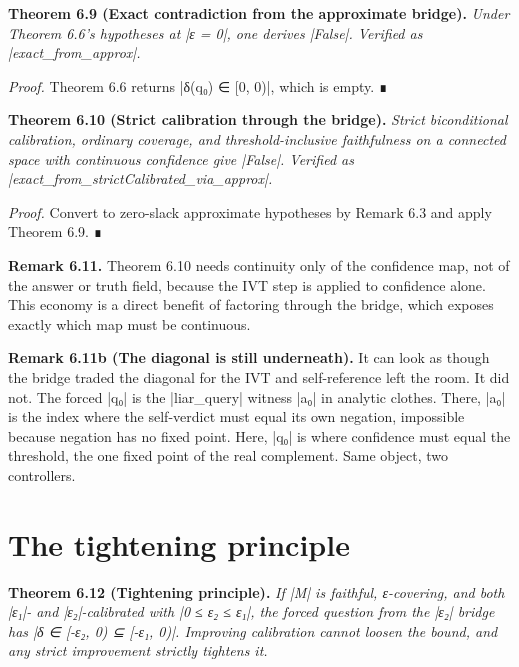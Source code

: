 \documentclass{memoir}
\begin{document}
\textbf{Theorem 6.9 (Exact contradiction from the approximate bridge).} \emph{Under Theorem
6.6's hypotheses at \LeanVerb|ε = 0|, one derives \LeanVerb|False|. Verified as
\LeanVerb|exact_from_approx|.}

\emph{Proof.} Theorem 6.6 returns \LeanVerb|δ(q₀) ∈ [0, 0)|, which is empty. ∎

\textbf{Theorem 6.10 (Strict calibration through the bridge).} \emph{Strict biconditional
calibration, ordinary coverage, and threshold-inclusive faithfulness on a
connected space with continuous confidence give \LeanVerb|False|. Verified as
\LeanVerb|exact_from_strictCalibrated_via_approx|.}

\emph{Proof.} Convert to zero-slack approximate hypotheses by Remark 6.3 and apply
Theorem 6.9. ∎

\textbf{Remark 6.11.} Theorem 6.10 needs continuity only of the confidence map, not of the
answer or truth field, because the IVT step is applied to confidence alone. This
economy is a direct benefit of factoring through the bridge, which exposes
exactly which map must be continuous.

\textbf{Remark 6.11b (The diagonal is still underneath).} It can look as though the bridge
traded the diagonal for the IVT and self-reference left the room. It did not.
The forced \LeanVerb|q₀| is the \LeanVerb|liar_query| witness \LeanVerb|a₀| in analytic clothes. There,
\LeanVerb|a₀| is the index where the self-verdict must equal its own negation, impossible
because negation has no fixed point. Here, \LeanVerb|q₀| is where confidence must equal
the threshold, the one fixed point of the real complement. Same object, two
controllers.



\section{The tightening principle}\label{Two--Schemas--of--Impossibility-005F-005F-005F--Machine--Checked--Limits--of--Trustworthy--Machine--Learning-005F-005F-005F--and--Why--They--Tighten--with--Capability----Approximate--Bridges--to--Real--Models----The--tightening--principle}

\textbf{Theorem 6.12 (Tightening principle).} \emph{If \LeanVerb|M| is faithful, ε-covering, and both
\LeanVerb|ε₁|- and \LeanVerb|ε₂|-calibrated with \LeanVerb|0 ≤ ε₂ ≤ ε₁|, the forced question from the \LeanVerb|ε₂|
bridge has \LeanVerb|δ ∈ [-ε₂, 0) ⊆ [-ε₁, 0)|. Improving calibration cannot loosen the
bound, and any strict improvement strictly tightens it.}
\end{document}
